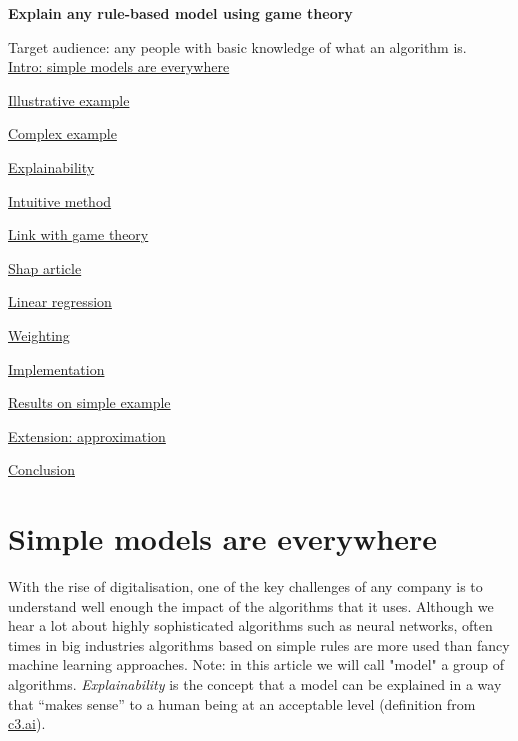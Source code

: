 {\fontsize{30pt}{40pt} \textbf{Explain any rule-based model using game theory}\par}

\vspace{10mm}

Target audience: any people with basic knowledge of what an algorithm is. \\

\hyperref[sec:simple-models-everywhere]{Intro: simple models are everywhere}

\hyperref[sec:illustrative-example]{Illustrative example}

\hyperref[sec:complex-example]{Complex example}

\hyperref[sec:explainability]{Explainability}

\hyperref[sec:intuitive-method]{Intuitive method}

\hyperref[sec:link-with-game-theory]{Link with game theory}

\hyperref[sec:shap-article]{Shap article}

\hyperref[sec:linear-regression]{Linear regression}

\hyperref[sec:weighting]{Weighting}

\hyperref[sec:implementation]{Implementation}

\hyperref[sec:results-simple-example]{Results on simple example}

\hyperref[sec:extension-approximation]{Extension: approximation}

\hyperref[sec:conclusion]{Conclusion}


\section{Simple models are everywhere}

\label{sec:simple-models-everywhere}

With the rise of digitalisation, one of the key challenges of any company is to understand well enough the impact of the algorithms that it uses. Although we hear a lot about highly sophisticated algorithms such as neural networks, often times in big industries algorithms based on simple rules are more used than fancy machine learning approaches. Note: in this article we will call "model" a group of algorithms. \textit{Explainability} is the concept that a model can be explained in a way that “makes sense” to a human being at an acceptable level (definition from \href{https://c3.ai/glossary/machine-learning/explainability/}{c3.ai}). \\

